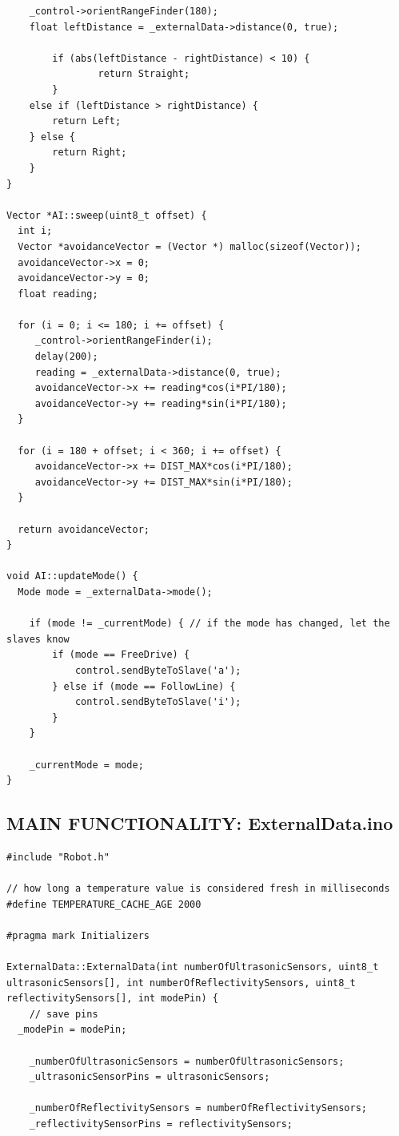 \documentclass[paper=a4, fontsize=11pt]{scrartcl}
\numberwithin{equation}{section}		%
\numberwithin{figure}{section}			%
\numberwithin{table}{section}				%
\begin{document}
{\begin{verbatim}
	_control->orientRangeFinder(180);
	float leftDistance = _externalData->distance(0, true);

        if (abs(leftDistance - rightDistance) < 10) {
                return Straight;
        }
	else if (leftDistance > rightDistance) {
		return Left;
	} else {
		return Right;
	} 
}

Vector *AI::sweep(uint8_t offset) {
  int i;
  Vector *avoidanceVector = (Vector *) malloc(sizeof(Vector));
  avoidanceVector->x = 0;
  avoidanceVector->y = 0;
  float reading;
  
  for (i = 0; i <= 180; i += offset) {
     _control->orientRangeFinder(i);
     delay(200);
     reading = _externalData->distance(0, true);
     avoidanceVector->x += reading*cos(i*PI/180);
     avoidanceVector->y += reading*sin(i*PI/180);
  }

  for (i = 180 + offset; i < 360; i += offset) {
     avoidanceVector->x += DIST_MAX*cos(i*PI/180);
     avoidanceVector->y += DIST_MAX*sin(i*PI/180);
  }

  return avoidanceVector;
}

void AI::updateMode() {
  Mode mode = _externalData->mode();
	
	if (mode != _currentMode) { // if the mode has changed, let the slaves know
		if (mode == FreeDrive) {
			control.sendByteToSlave('a');
		} else if (mode == FollowLine) {
			control.sendByteToSlave('i');
		}
	}
	
	_currentMode = mode;
}

\end{verbatim}
\subsection{MAIN FUNCTIONALITY: ExternalData.ino}
\begin{verbatim}
#include "Robot.h"

// how long a temperature value is considered fresh in milliseconds 
#define TEMPERATURE_CACHE_AGE 2000

#pragma mark Initializers

ExternalData::ExternalData(int numberOfUltrasonicSensors, uint8_t ultrasonicSensors[], int numberOfReflectivitySensors, uint8_t reflectivitySensors[], int modePin) {
	// save pins
  _modePin = modePin;
	
	_numberOfUltrasonicSensors = numberOfUltrasonicSensors;
	_ultrasonicSensorPins = ultrasonicSensors;
	
	_numberOfReflectivitySensors = numberOfReflectivitySensors;
	_reflectivitySensorPins = reflectivitySensors;
    

\end{verbatim}}
\end{document}
